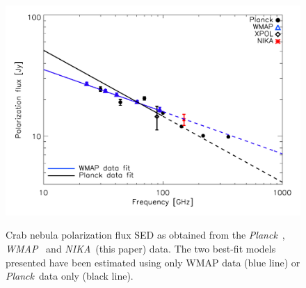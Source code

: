\documentclass[twocolumn,traditabstract]{aa}
\def\NIKA{\textit{NIKA}}
\def\Planck{\textit{Planck}}
\def\WMAP{\textit{WMAP}}
\begin{document}
\begin{figure}
  \centering
             { \includegraphics[width=1\linewidth,keepaspectratio]{figures/Crab_SED_ipol.pdf}}
           \caption{Crab nebula polarization flux SED as obtained from the \Planck\ \citep{2015arXiv150702058P}, \WMAP\ \citep{2011ApJS..192...19W} and \NIKA\ (this paper) data. The two best-fit models presented have been estimated using only WMAP data (blue line) or \Planck\ data only (black line).}
\label{crab_SED_ipol}		
  \end{figure} 
 \noindent


\end{document}
